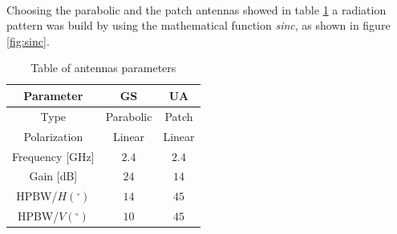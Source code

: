 \paragraph{}Choosing the parabolic and the patch antennas showed in table \ref{table:1} a radiation pattern was build by using the mathematical function \textit{sinc}, as shown in figure \ref{fig:sinc}.

\begin{table}[h]
	\centering
	\begin{tabular}{|c||c|c|}
		\hline
		Parameter & GS & UA\\ \hline\hline
		Type & Parabolic & Patch\\ \hline
		Polarization & Linear & Linear\\ \hline
		Frequency [GHz] & $2.4$ & $2.4$\\ \hline
		Gain [dB] & $24$ & $14$\\ \hline
		HPBW/$H(^{\circ})$ & $14$ & $45$\\ \hline
		HPBW/$V(^{\circ})$ & $10$ & $45$\\ \hline
	\end{tabular}
	\caption{Table of antennas parameters}
	\label{table:1}
\end{table}

